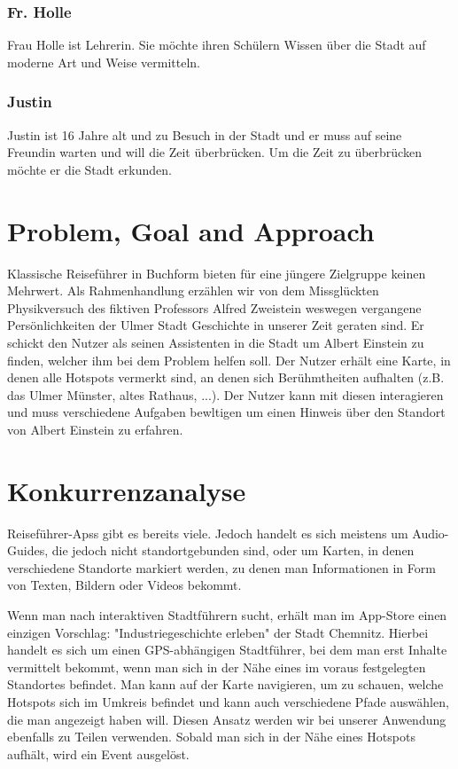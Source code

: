 \documentclass[]{hci-proposal}
\begin{document}
\subsubsection*{Fr. Holle}
Frau Holle ist Lehrerin. Sie möchte ihren Schülern Wissen über die Stadt auf moderne Art und Weise vermitteln.
\subsubsection*{Justin}
Justin ist 16 Jahre alt und zu Besuch in der Stadt und er muss auf seine Freundin warten und will die Zeit überbrücken.
Um die Zeit zu überbrücken möchte er die Stadt erkunden.

\section{Problem, Goal and Approach}
Klassische Reiseführer in Buchform bieten für eine jüngere Zielgruppe keinen Mehrwert.
Als Rahmenhandlung erzählen wir von dem Missglückten Physikversuch des fiktiven Professors Alfred Zweistein weswegen vergangene Persönlichkeiten der Ulmer Stadt Geschichte in unserer Zeit geraten sind.
Er schickt den Nutzer als seinen Assistenten in die Stadt um Albert Einstein zu finden, welcher ihm bei dem Problem helfen soll.
Der Nutzer erhält eine Karte, in denen alle Hotspots vermerkt sind, an denen sich Berühmtheiten aufhalten (z.B. das Ulmer
Münster, altes Rathaus, ...). Der Nutzer kann mit diesen interagieren und muss verschiedene Aufgaben bewltigen um einen
Hinweis über den Standort von Albert Einstein zu erfahren.


\section{Konkurrenzanalyse}

Reiseführer-Apss gibt es bereits viele. Jedoch handelt es sich meistens um Audio-Guides, die jedoch nicht standortgebunden sind,
oder um Karten, in denen verschiedene Standorte markiert werden, zu denen man Informationen in Form von Texten, Bildern oder
Videos bekommt.

Wenn man nach interaktiven Stadtführern sucht, erhält man im App-Store einen einzigen Vorschlag: "Industriegeschichte erleben" der
Stadt Chemnitz. Hierbei handelt es sich um einen GPS-abhängigen Stadtführer, bei dem man erst Inhalte vermittelt bekommt, wenn man sich
in der Nähe eines im voraus festgelegten Standortes befindet. Man kann auf der Karte navigieren, um zu schauen, welche Hotspots
sich im Umkreis befindet und kann auch verschiedene Pfade auswählen, die man angezeigt haben will.
Diesen Ansatz werden wir bei unserer Anwendung ebenfalls zu Teilen verwenden. Sobald man sich in der Nähe eines Hotspots aufhält,
wird ein Event ausgelöst.
\end{document}
